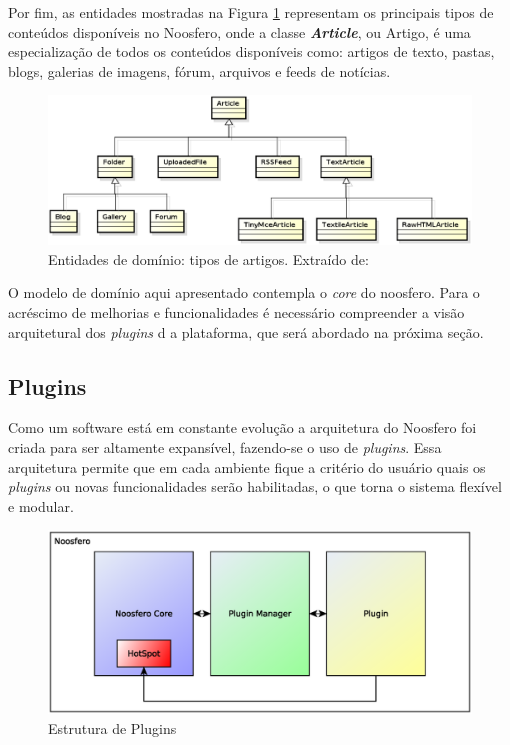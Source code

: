 Por fim, as entidades mostradas na Figura \ref{domain_articles} representam os principais tipos de conteúdos disponíveis no Noosfero, onde a classe \textbf{\textit{Article}}, ou Artigo, é uma especialização de todos os conteúdos disponíveis como: artigos de texto, pastas, blogs, galerias de imagens, fórum, arquivos e feeds de notícias.

\begin{figure}[h]
    \centering
    \includegraphics[keepaspectratio=true,scale=0.55]
      {figuras/domain_articles.eps}
    \caption{Entidades de domínio: tipos de artigos. Extraído de: \cite{bucher2013rede}}
    \label{domain_articles}
\end{figure}

O modelo de domínio aqui apresentado contempla o \textit{core} do noosfero. Para o acréscimo de melhorias e funcionalidades é necessário compreender a visão arquitetural dos \textit{plugins} d a plataforma, que será abordado na próxima seção.

\subsection{Plugins}

Como um software está em constante evolução a arquitetura do Noosfero foi criada para ser altamente expansível, fazendo-se o uso de \textit{plugins}. Essa arquitetura permite que em cada ambiente fique a critério do usuário quais os \textit{plugins} ou novas funcionalidades serão habilitadas, o que torna o sistema flexível e modular.

\begin{figure}[h]
    \centering
    \includegraphics[keepaspectratio=true,scale=0.4]
      {figuras/estruturaDePlugins.eps}
    \caption{Estrutura de Plugins}
    \label{estrutura-plugins}
\end{figure}


